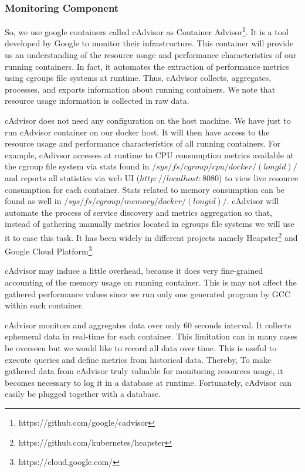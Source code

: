 \subsubsection{Monitoring Component}
So, we use google containers called cAdvisor as Container Advisor\footnote{https://github.com/google/cadvisor}. It is a tool developed by Google to monitor their infrastructure. This container will provide us an understanding of the resource usage and performance characteristics of our running containers. In fact, it automates the extraction of performance metrics using cgroups file systems at runtime. Thus, cAdvisor collects, aggregates, processes, and exports information about running containers. We note that resource usage information is collected in raw data.

cAdvisor does not need any configuration on the host machine. We have just to run cAdvisor container on our docker host. It will then have access to the resource usage and performance characteristics of all running containers. For example, cAdivsor accesses at runtime to CPU consumption metrics available at the cgroup file system via stats found in $/sys/fs/cgroup/cpu/docker/(longid)/$ and reports all statistics via web UI ($http://localhost:8080$) to view live resource consumption for each container. Stats related to memory consumption can be found as well in $/sys/fs/cgroup/memory/docker/(longid)/$. cAdvisor will automate the process of service discovery and metrics aggregation so that, instead of gathering manually metrics located in cgroups file systems we will use it to ease this task. It has been widely in different projects namely Heapster\footnote{https://github.com/kubernetes/heapster} and Google Cloud Platform\footnote{https://cloud.google.com/}.

cAdvisor may induce a little overhead, because it does very fine-grained accounting of the memory usage on running container. This is may not affect the gathered performance values since we run only one generated program by GCC within each container.

cAdvisor monitors and aggregates data over only 60 seconds interval. It collects ephemeral data in real-time for each container. This limitation can in many cases be overseen but we would like to record all data over time. This is useful to execute queries and define metrics from historical data. Thereby, To make gathered data from cAdvisor truly valuable for monitoring resources usage, it becomes necessary to log it in a database at runtime. Fortunately, cAdvisor can easily be plugged together with a database.
